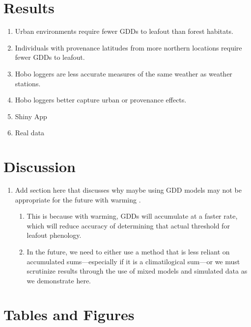 \documentclass{article}\usepackage[]{graphicx}\usepackage[]{color}
\begin{document}
\section*{Results}
\begin{enumerate}
\item Urban environments require fewer GDDs to leafout than forest habitats.
 
\item Individuals with provenance latitudes from more northern locations require fewer GDDs to leafout. 
  
\item Hobo loggers are less accurate measures of the same weather as weather stations.

\item Hobo loggers better capture urban or provenance effects.
  
\item Shiny App 
  
\item Real data 
\end{enumerate}

\section*{Discussion} 
\begin{enumerate}
\item Add section here that discusses why maybe using GDD models may not be appropriate for the future with warming \citep{Man2010}. 
  \begin{enumerate}
  \item This is because with warming, GDDs will accumulate at a faster rate, which will reduce accuracy of determining that actual threshold for leafout phenology. 
  \item In the future, we need to either use a method that is less reliant on accumulated sums---especially if it is a climatilogical sum---or we must scrutinize results through the use of mixed models and simulated data as we demonstrate here. 
  \end{enumerate}
\end{enumerate}






\section*{Tables and Figures}
\end{document}
